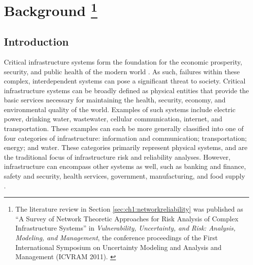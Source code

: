 
\chapter[Background]{Background \footnote[1]{The literature review in Section \ref{sec:ch1:networkreliability} was published as ``A Survey of Network Theoretic Approaches for Risk Analysis of Complex Infrastructure Systems'' in \emph{Vulnerability, Uncertainty, and Risk: Analysis, Modeling, and Management}, the conference proceedings of the First International Symposium on Uncertainty Modeling and Analysis and Management (ICVRAM 2011). \cite{LaRocca2011a}}}
\label{ch1}


\section{Introduction}
\label{sec:ch1:intro}

Critical infrastructure systems form the foundation for the economic prosperity, security, and public health of the modern world \cite{Rinaldi2004}. As such, failures within these complex, interdependent systems can pose a significant threat to society. Critical infrastructure systems can be broadly defined as physical entities that provide the basic services necessary for maintaining the health, security, economy, and environmental quality of the world. Examples of such systems include electric power, drinking water, wastewater, cellular communication, internet, and transportation. These examples can each be more generally classified into one of four categories of infrastructure: information and communication; transportation; energy; and water. These categories primarily represent physical systems, and are the traditional focus of infrastructure risk and reliability analyses. However, infrastructure can encompass other systems as well, such as banking and finance, safety and security, health services, government, manufacturing, and food supply \cite{PPD21}.

